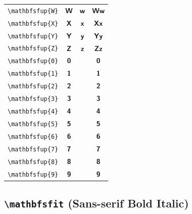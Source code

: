 \documentclass[12pt,a4paper]{article}
\begin{document}
\begin{longtable}{|c|c|c|c|}
\verb|\mathbfsfup{W}| & $\mathbfsfup{W}$ & $\mathbfsfup{w}$ & $ 𝗪 𝘄 $ \\
\verb|\mathbfsfup{X}| & $\mathbfsfup{X}$ & $\mathbfsfup{x}$ & $ 𝗫 𝘅 $ \\
\verb|\mathbfsfup{Y}| & $\mathbfsfup{Y}$ & $\mathbfsfup{y}$ & $ 𝗬 𝘆 $ \\
\verb|\mathbfsfup{Z}| & $\mathbfsfup{Z}$ & $\mathbfsfup{z}$ & $ 𝗭 𝘇 $ \\
\verb|\mathbfsfup{0}| & $\mathbfsfup{0}$ & & $ 𝟬 $ \\
\verb|\mathbfsfup{1}| & $\mathbfsfup{1}$ & & $ 𝟭 $ \\
\verb|\mathbfsfup{2}| & $\mathbfsfup{2}$ & & $ 𝟮 $ \\
\verb|\mathbfsfup{3}| & $\mathbfsfup{3}$ & & $ 𝟯 $ \\
\verb|\mathbfsfup{4}| & $\mathbfsfup{4}$ & & $ 𝟰 $ \\
\verb|\mathbfsfup{5}| & $\mathbfsfup{5}$ & & $ 𝟱 $ \\
\verb|\mathbfsfup{6}| & $\mathbfsfup{6}$ & & $ 𝟲 $ \\
\verb|\mathbfsfup{7}| & $\mathbfsfup{7}$ & & $ 𝟳 $ \\
\verb|\mathbfsfup{8}| & $\mathbfsfup{8}$ & & $ 𝟴 $ \\
\verb|\mathbfsfup{9}| & $\mathbfsfup{9}$ & & $ 𝟵 $ \\
\hline
\end{longtable}

\newpage

\subsection*{\texttt{\textbackslash{}mathbfsfit} (Sans-serif Bold Italic)}
\end{document}

